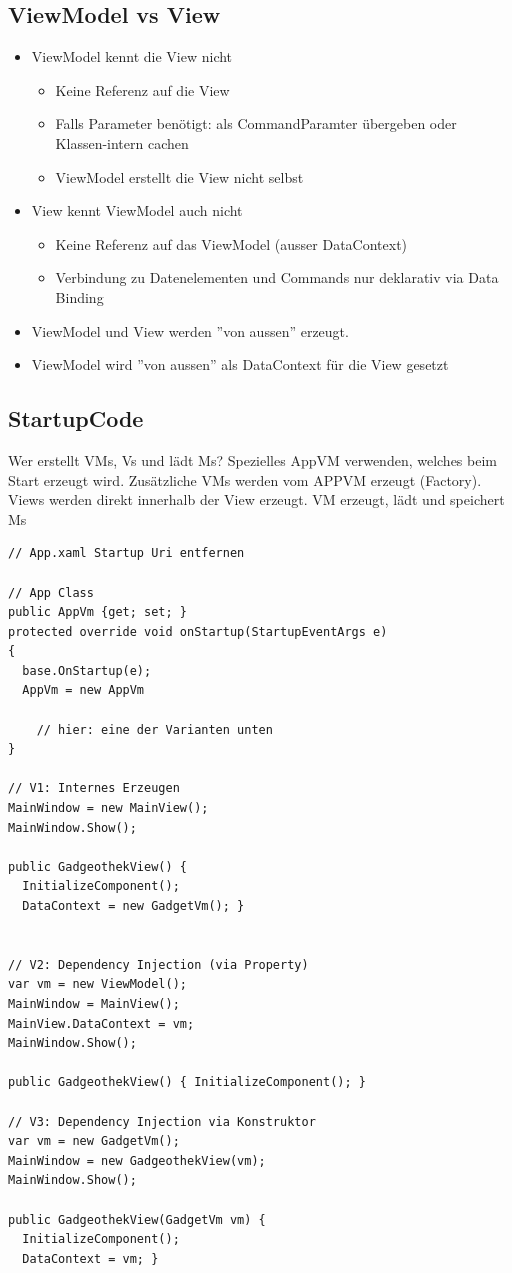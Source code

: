\subsection{ViewModel vs View}
\begin{itemize}
    \item ViewModel kennt die View nicht
    \begin{itemize}
    \item Keine Referenz auf die View
    \item Falls Parameter benötigt: als CommandParamter übergeben oder Klassen-intern cachen
    \item ViewModel erstellt die View nicht selbst 
    \end{itemize}
    \item View kennt ViewModel auch nicht
    \begin{itemize}
        \item Keine Referenz auf das ViewModel (ausser DataContext)
        \item Verbindung zu Datenelementen und Commands nur deklarativ via Data Binding
    \end{itemize}
    \item ViewModel und View werden ''von aussen'' erzeugt.
    \item ViewModel wird ''von aussen'' als DataContext für die View gesetzt
\end{itemize}


\subsection{StartupCode} Wer erstellt VMs, Vs und lädt Ms? Spezielles AppVM verwenden, welches beim Start erzeugt wird. Zusätzliche VMs werden vom APPVM erzeugt (Factory). Views werden direkt innerhalb der View erzeugt. VM erzeugt, lädt und speichert Ms

\begin{lstlisting}
// App.xaml Startup Uri entfernen

// App Class
public AppVm {get; set; }
protected override void onStartup(StartupEventArgs e)
{
  base.OnStartup(e);
  AppVm = new AppVm
    
    // hier: eine der Varianten unten
}

// V1: Internes Erzeugen  
MainWindow = new MainView();
MainWindow.Show();

public GadgeothekView() { 
  InitializeComponent();
  DataContext = new GadgetVm(); } 


// V2: Dependency Injection (via Property)
var vm = new ViewModel();
MainWindow = MainView();
MainView.DataContext = vm;
MainWindow.Show();

public GadgeothekView() { InitializeComponent(); }

// V3: Dependency Injection via Konstruktor
var vm = new GadgetVm(); 
MainWindow = new GadgeothekView(vm);
MainWindow.Show();

public GadgeothekView(GadgetVm vm) { 
  InitializeComponent();
  DataContext = vm; } 

\end{lstlisting}